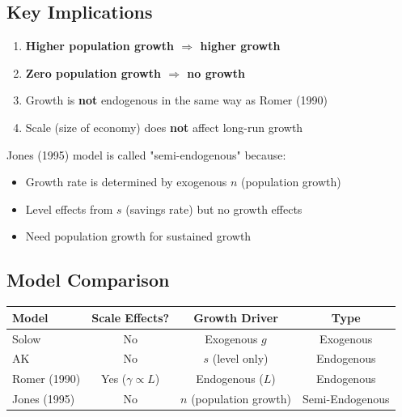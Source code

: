 \subsection{Key Implications}

\begin{enumerate}
    \item \textbf{Higher population growth $\Rightarrow$ higher growth}
    \item \textbf{Zero population growth $\Rightarrow$ no growth}
    \item Growth is \textbf{not} endogenous in the same way as Romer (1990)
    \item Scale (size of economy) does \textbf{not} affect long-run growth
\end{enumerate}

\begin{tcolorbox}[colback=blue!10,colframe=blue3,title=Semi-Endogenous Growth]
Jones (1995) model is called "semi-endogenous" because:
\begin{itemize}
    \item Growth rate is determined by exogenous $n$ (population growth)
    \item Level effects from $s$ (savings rate) but no growth effects
    \item Need population growth for sustained growth
\end{itemize}
\end{tcolorbox}

\subsection{Model Comparison}

\begin{center}
\begin{tabular}{lccc}
\toprule
\textbf{Model} & \textbf{Scale Effects?} & \textbf{Growth Driver} & \textbf{Type} \\
\midrule
Solow & No & Exogenous $g$ & Exogenous \\
AK & No & $s$ (level only) & Endogenous \\
Romer (1990) & Yes ($\gamma \propto L$) & Endogenous ($L$) & Endogenous \\
Jones (1995) & No & $n$ (population growth) & Semi-Endogenous \\
\bottomrule
\end{tabular}
\end{center}



